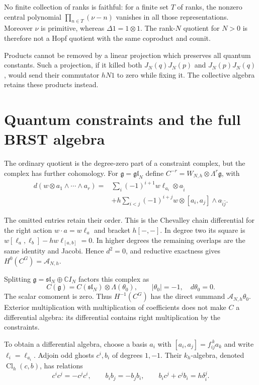 No finite collection of ranks is faithful: for a finite set
$T$ of ranks, the nonzero central polynomial
$\prod_{n\in T}(\nu-n)$ vanishes in all those representations.
Moreover $\nu$ is primitive, whereas $\Delta1=1\otimes1$.
The rank-$N$ quotient for $N>0$ is therefore not a Hopf quotient
with the same coproduct and counit.

Products cannot be removed by a linear projection which
preserves all quantum constants. Such a projection, if it killed
both $J_N(q)J_N(p)$ and $J_N(p)J_N(q)$, would send their
commutator $hN1$ to zero while fixing it. The collective
algebra retains these products instead.

\section{Quantum constraints and the full BRST algebra}

The ordinary quotient is the degree-zero part of a constraint
complex, but the complex has further cohomology. For
$\mathfrak g=\mathfrak{gl}_N$ define
$C^{-r}=W_{N,h}\otimes\Lambda^r\mathfrak g$, with
\begin{align*}
 d(w\otimes a_1\wedge\cdots\wedge a_r)
 ={}&\sum_i(-1)^{i+1}w\ell_{a_i}\otimes a_{\widehat i}\\
 &+h\sum_{i<j}(-1)^{i+j}
   w\otimes[a_i,a_j]\wedge a_{\widehat i\widehat j}.
\end{align*}

The omitted entries retain their order. This is the Chevalley
chain differential for the right action $w\cdot a=w\ell_a$
and bracket $h[-,-]$. In degree two its square is
$w[\ell_a,\ell_b]-hw\ell_{[a,b]}=0$. In higher degrees the
remaining overlaps are the same identity and Jacobi. Hence
$d^2=0$, and reductive exactness gives
$H^0(C^G)=\mathcal A_{N,h}$.

Splitting $\mathfrak g=\mathfrak{sl}_N\oplus\mathbb CI_N$
factors this complex as
\[
 C(\mathfrak g)=C(\mathfrak{sl}_N)\otimes\Lambda(\theta_0),
 \qquad |\theta_0|=-1,\quad d\theta_0=0.
\]
The scalar comoment is zero. Thus $H^{-1}(C^G)$ has the
direct summand $\mathcal A_{N,h}\theta_0$.
Exterior multiplication with multiplication of coefficients
does not make $C$ a differential algebra: its differential
contains right multiplication by the constraints.

To obtain a differential algebra, choose a basis $a_i$ with
$[a_i,a_j]=f_{ij}^{\ k}a_k$ and write $\ell_i=\ell_{a_i}$.
Adjoin odd ghosts $c^i,b_i$ of degrees $1,-1$.
Their $k_h$-algebra, denoted $\operatorname{Cl}_h(c,b)$, has relations
\[
 c^ic^j=-c^jc^i,\qquad b_ib_j=-b_jb_i,\qquad
 b_ic^j+c^jb_i=h\delta_i^j.
\]

